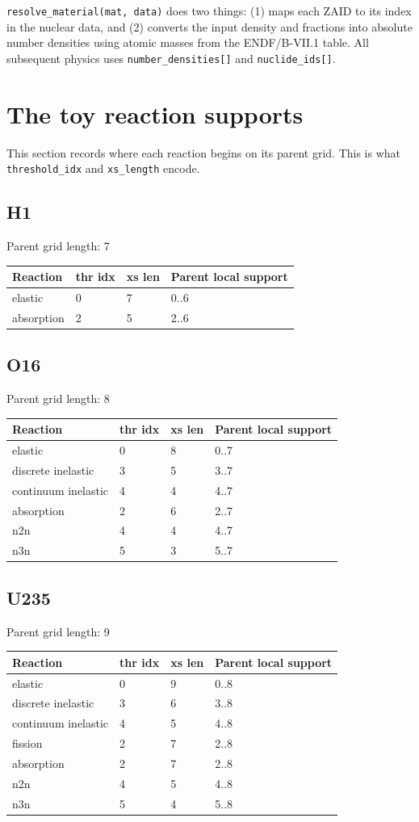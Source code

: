 \documentclass[11pt,a4paper]{article}
\begin{document}
\texttt{resolve\_material(mat, data)} does two things: (1) maps each ZAID to its index in the nuclear data, and (2) converts the input density and fractions into absolute number densities using atomic masses from the ENDF/B-VII.1 table. All subsequent physics uses \texttt{number\_densities[]} and \texttt{nuclide\_ids[]}.

\section{The toy reaction supports}
This section records where each reaction begins on its parent grid. This is what \texttt{threshold\_idx} and \texttt{xs\_length} encode.

\subsection{H1}
Parent grid length: 7
\begin{longtable}{p{3.3cm} p{2cm} p{2cm} p{4.3cm}}
\toprule
Reaction & thr idx & xs len & Parent local support \\
\midrule
elastic & 0 & 7 & 0..6 \\
absorption & 2 & 5 & 2..6 \\
\bottomrule
\end{longtable}

\subsection{O16}
Parent grid length: 8
\begin{longtable}{p{3.3cm} p{2cm} p{2cm} p{4.3cm}}
\toprule
Reaction & thr idx & xs len & Parent local support \\
\midrule
elastic & 0 & 8 & 0..7 \\
discrete inelastic & 3 & 5 & 3..7 \\
continuum inelastic & 4 & 4 & 4..7 \\
absorption & 2 & 6 & 2..7 \\
n2n & 4 & 4 & 4..7 \\
n3n & 5 & 3 & 5..7 \\
\bottomrule
\end{longtable}

\subsection{U235}
Parent grid length: 9
\begin{longtable}{p{3.3cm} p{2cm} p{2cm} p{4.3cm}}
\toprule
Reaction & thr idx & xs len & Parent local support \\
\midrule
elastic & 0 & 9 & 0..8 \\
discrete inelastic & 3 & 6 & 3..8 \\
continuum inelastic & 4 & 5 & 4..8 \\
fission & 2 & 7 & 2..8 \\
absorption & 2 & 7 & 2..8 \\
n2n & 4 & 5 & 4..8 \\
n3n & 5 & 4 & 5..8 \\
\bottomrule
\end{longtable}
\end{document}
